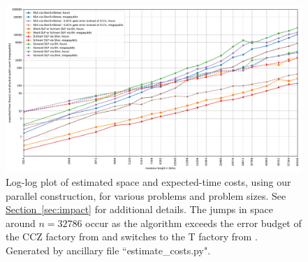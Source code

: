 \documentclass[a4paper, onecolumn, accepted=2021-03-29]{quantumarticle}
\renewcommand{\sec}[1]{\hyperref[sec:#1]{Section~\ref*{sec:#1}}}
\begin{document}
\begin{figure}[p]
    \begin{center}
    \includegraphics[width=1.0\textwidth]{assets/rsa-dlps-extras.pdf}
    \end{center}
    \caption{
    Log-log plot of estimated space and expected-time costs, using our parallel construction, for various problems and problem sizes.
    See \sec{impact} for additional details.
    The jumps in space around $n=32786$ occur as the algorithm exceeds the error budget of the CCZ factory from \cite{gidney2018magic} and switches to the T factory from \cite{fowler2018}.
    Generated by ancillary file ``estimate\_costs.py".
    }
    \label{fig:plot-costs}
\end{figure}
\end{document}

